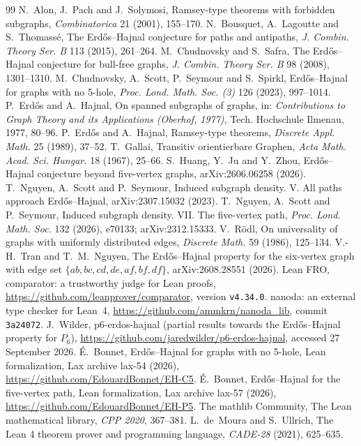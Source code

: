 \documentclass[11pt]{amsart}
\theoremstyle{definition}
\theoremstyle{remark}
\begin{document}
\begin{thebibliography}{99}
 N.~Alon, J.~Pach and J.~Solymosi, Ramsey-type theorems with forbidden subgraphs,
  \emph{Combinatorica} 21 (2001), 155--170.
 N.~Bousquet, A.~Lagoutte and S.~Thomass\'e, The Erd\H{o}s--Hajnal conjecture for paths
  and antipaths, \emph{J. Combin. Theory Ser. B} 113 (2015), 261--264.
 M.~Chudnovsky and S.~Safra, The Erd\H{o}s--Hajnal conjecture for bull-free graphs,
  \emph{J. Combin. Theory Ser. B} 98 (2008), 1301--1310.
 M.~Chudnovsky, A.~Scott, P.~Seymour and S.~Spirkl, Erd\H{o}s--Hajnal for graphs with no
  5-hole, \emph{Proc. Lond. Math. Soc. (3)} 126 (2023), 997--1014.
 P.~Erd\H{o}s and A.~Hajnal, On spanned subgraphs of graphs, in: \emph{Contributions to Graph
  Theory and its Applications (Oberhof, 1977)}, Tech. Hochschule Ilmenau, 1977, 80--96.
 P.~Erd\H{o}s and A.~Hajnal, Ramsey-type theorems, \emph{Discrete Appl. Math.} 25 (1989),
  37--52.
 T.~Gallai, Transitiv orientierbare Graphen, \emph{Acta Math. Acad. Sci. Hungar.} 18
  (1967), 25--66.
 S.~Huang, Y.~Ju and Y.~Zhou, Erd\H{o}s--Hajnal conjecture beyond five-vertex graphs,
  arXiv:2606.06258 (2026).
 T.~Nguyen, A.~Scott and P.~Seymour, Induced subgraph density. V. All paths approach
  Erd\H{o}s--Hajnal, arXiv:2307.15032 (2023).
 T.~Nguyen, A.~Scott and P.~Seymour, Induced subgraph density. VII. The five-vertex path,
  \emph{Proc. Lond. Math. Soc.} 132 (2026), e70133; arXiv:2312.15333.
 V.~R\"odl, On universality of graphs with uniformly distributed edges, \emph{Discrete
  Math.} 59 (1986), 125--134.
 V.-H.~Tran and T.~M.~Nguyen, The Erd\H{o}s--Hajnal property for the six-vertex graph with edge set
  $\{ab,bc,cd,de,af,bf,df\}$, arXiv:2608.28551 (2026).
 Lean FRO, comparator: a trustworthy judge for Lean proofs,
  \url{https://github.com/leanprover/comparator}, version \texttt{v4.34.0}.
 nanoda: an external type checker for Lean~4,
  \url{https://github.com/ammkrn/nanoda_lib}, commit \texttt{3a24072}.
 J.~Wilder, p6-erdos-hajnal (partial results towards the Erd\H{o}s--Hajnal property for
  $P_6$), \url{https://github.com/jaredwilder/p6-erdos-hajnal}, accessed 27 September 2026.
 \'E.~Bonnet, Erd\H{o}s--Hajnal for graphs with no 5-hole, Lean formalization, Lax archive
  lax-54 (2026), \url{https://github.com/EdouardBonnet/EH-C5}.
 \'E.~Bonnet, Erd\H{o}s--Hajnal for the five-vertex path, Lean formalization, Lax archive
  lax-57 (2026), \url{https://github.com/EdouardBonnet/EH-P5}.
 The mathlib Community, The Lean mathematical library, \emph{CPP 2020}, 367--381.
 L.~de~Moura and S.~Ullrich, The Lean 4 theorem prover and programming language,
  \emph{CADE-28} (2021), 625--635.
\end{thebibliography}
\end{document}
